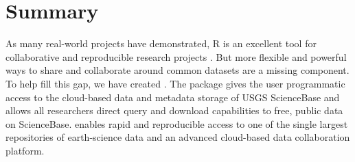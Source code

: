 \section{Summary}

As many real-world projects have demonstrated, R is
an excellent tool for collaborative and reproducible
research projects \citep{Gandrud213}. But more flexible and powerful
ways to share and collaborate around common datasets
are a missing component. To help fill this gap, we
have created . The  package
gives the user programmatic access to the
cloud-based data and metadata storage of USGS ScienceBase
and allows all researchers direct query and download
capabilities to free, public data on ScienceBase.
 enables rapid and reproducible
access to one of the single
largest repositories of earth-science data and an advanced
cloud-based data collaboration platform.
